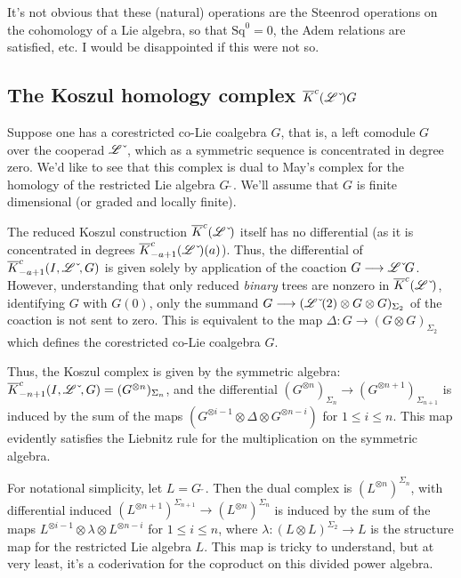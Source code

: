 \documentclass[10pt]{article}
\newcommand{\Sq}{\mathrm{Sq}}
\newcommand{\dual}{\,\check{\,}}
\newcommand{\LieOperad}{\scrL}
\newcommand{\dualLieOperad}{\LieOperad\dual}
\begin{document}
\begin{PRlieKoszulComplexCalculation}
It's not obvious that these (natural) operations are the Steenrod operations on the cohomology of a Lie algebra, so that $\Sq^0=0$, the Adem relations are satisfied, etc. I would be disappointed if this were not so.

\subsection{The Koszul homology complex $\overline{K}^c(\dualLieOperad)\circ G$}
Suppose one has a corestricted co-Lie coalgebra $G$, that is, a left comodule $G$ over the cooperad $\dualLieOperad$, which as a symmetric sequence is concentrated in degree zero. We'd like to see that this complex is dual to May's complex for the homology of the restricted Lie algebra $G\dual$. We'll assume that $G$ is finite dimensional (or graded and locally finite).

The reduced Koszul construction $\overline{K}^c(\dualLieOperad)$ itself has no differential (as it is concentrated in degrees $\overline{K}^c_{-a+1}(\dualLieOperad)(a)$). Thus, the differential of $\overline{K}^c_{-a+1}(I,\dualLieOperad,G)$ is given solely by application of the coaction $G\to\dualLieOperad\circ G$. However, understanding that only reduced \emph{binary} trees are nonzero in $\overline{K}^c(\dualLieOperad)$, identifying $G$ with $G(0)$, only the summand $G\to(\dualLieOperad(2)\otimes G\otimes G)_{\Sigma_2}$ of the coaction is not sent to zero. This is equivalent to the map $\Delta:G\to(G\otimes G)_{\Sigma_2}$ which defines the corestricted co-Lie coalgebra $G$.

Thus, the Koszul complex is given by the symmetric algebra: $\overline{K}^c_{-n+1}(I,\dualLieOperad,G)=(G^{\otimes n})_{\Sigma_n}$, and the differential $(G^{\otimes n})_{\Sigma_n}\to (G^{\otimes n+1})_{\Sigma_{n+1}}$ is induced by the sum of the maps $(G^{\otimes i-1}\otimes\Delta\otimes G^{\otimes n-i})$ for $1\leq i\leq n$. This map evidently satisfies the Liebnitz rule for the multiplication on the symmetric algebra.

For notational simplicity, let $L=G\dual$. Then the dual complex is $(L^{\otimes n})^{\Sigma_n}$, with differential induced $(L^{\otimes n+1})^{\Sigma_{n+1}}\to (L^{\otimes n})^{\Sigma_n}$ is induced by the sum of the maps $L^{\otimes i-1}\otimes\lambda\otimes L^{\otimes n-i}$ for $1\leq i\leq n$, where $\lambda:(L\otimes L)^{\Sigma_2}\to L$ is the structure map for the restricted Lie algebra $L$. This map is tricky to understand, but at very least, it's a coderivation for the coproduct on this divided power algebra.


\end{PRlieKoszulComplexCalculation}
\end{document}
